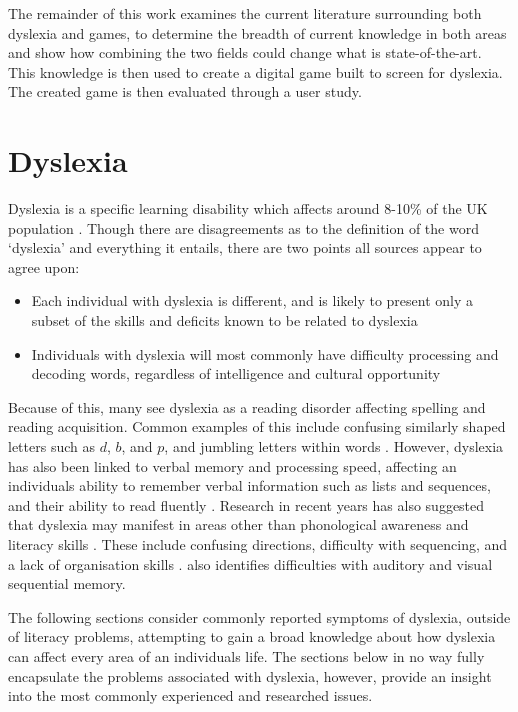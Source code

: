 \documentclass[journal]{IEEEtran}
\begin{document}
The remainder of this work examines the current literature surrounding both dyslexia and games, to determine the breadth of current knowledge in both areas and show how combining the two fields could change what is state-of-the-art. This knowledge is then used to create a digital game built to screen for dyslexia. The created game is then evaluated through a user study.

\section{Dyslexia}
\label{sec:dyslexia}

Dyslexia is a specific learning disability which affects around 8-10\% of the UK population \cite{Nhs,bda}. Though there are disagreements as to the definition of the word `dyslexia' and everything it entails, there are two points all sources appear to agree upon:
\begin{itemize}
\item Each individual with dyslexia is different, and is likely to present only a
	subset of the skills and deficits known to be related to dyslexia 
\item Individuals with dyslexia will most commonly have difficulty processing
	and decoding words, regardless of intelligence and cultural opportunity
\end{itemize}

Because of this, many see dyslexia as a reading disorder affecting spelling and reading acquisition. Common examples of this include confusing similarly shaped letters such as $d$, $b$, and $p$, and jumbling letters within words \cite{DetectAndManage}. However, dyslexia has also been linked to verbal memory and processing speed, affecting an individuals ability to remember verbal information such as lists and sequences, and their ability to read fluently \cite{Nhs, RoseReview}. Research in recent years has also suggested that dyslexia may manifest in areas other than phonological awareness and literacy skills \cite{snowling, DetectAndManage}.  These include confusing directions, difficulty with sequencing, and a lack of organisation skills \cite{bda}. \cite{DetectAndManage} also identifies difficulties with auditory and visual sequential memory.

The following sections consider commonly reported symptoms of dyslexia, outside of literacy problems, attempting to gain a broad knowledge about how dyslexia can affect every area of an individuals life. The sections below in no way fully encapsulate the problems associated with dyslexia, however, provide an insight into the most commonly experienced and researched issues.
\end{document}
